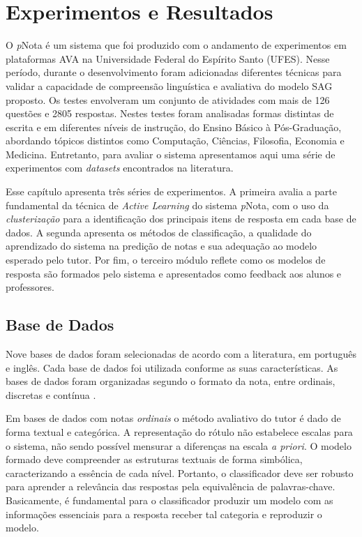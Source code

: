 \chapter{Experimentos e Resultados}
\label{cap-experimentos}

O \textit{p}Nota é um sistema que foi produzido com o andamento de experimentos em plataformas AVA na Universidade Federal do Espírito Santo (UFES). Nesse período, durante o desenvolvimento foram adicionadas diferentes técnicas para validar a capacidade de compreensão linguística e avaliativa do modelo SAG proposto. Os testes envolveram um conjunto de atividades com mais de 126 questões e 2805 respostas. Nestes testes foram analisadas formas distintas de escrita e em diferentes níveis de instrução, do Ensino Básico à Pós-Graduação, abordando tópicos distintos como Computação, Ciências, Filosofia, Economia e Medicina. Entretanto, para avaliar o sistema apresentamos aqui uma série de experimentos com \textit{datasets} encontrados na literatura.

Esse capítulo apresenta três séries de experimentos. A primeira avalia a parte fundamental da técnica de \textit{Active Learning} do sistema \textit{p}Nota, com o uso da \textit{clusterização} para a identificação dos principais itens de resposta em cada base de dados. A segunda apresenta os métodos de classificação, a qualidade do aprendizado do sistema na predição de notas e sua adequação ao modelo esperado pelo tutor. Por fim, o terceiro módulo reflete como os modelos de resposta são formados pelo sistema e apresentados como feedback aos alunos e professores.

\section{Base de Dados}
 Nove bases de dados foram selecionadas de acordo com a literatura, em português e inglês. Cada base de dados foi utilizada conforme as suas características. As bases de dados foram organizadas segundo o formato da nota, entre ordinais, discretas e contínua \cite{morettin2010}.

Em bases de dados com notas \textit{ordinais} o método avaliativo do tutor é dado de forma textual e categórica. A representação do rótulo não estabelece escalas para o sistema, não sendo possível mensurar a diferenças na escala \textit{a priori}. O modelo formado deve compreender as estruturas textuais de forma simbólica, caracterizando a essência de cada nível. Portanto, o classificador deve ser robusto para aprender a relevância das respostas pela equivalência de palavras-chave. Basicamente, é fundamental para o classificador produzir um modelo com as informações essenciais para a resposta receber tal categoria e reproduzir o modelo.

